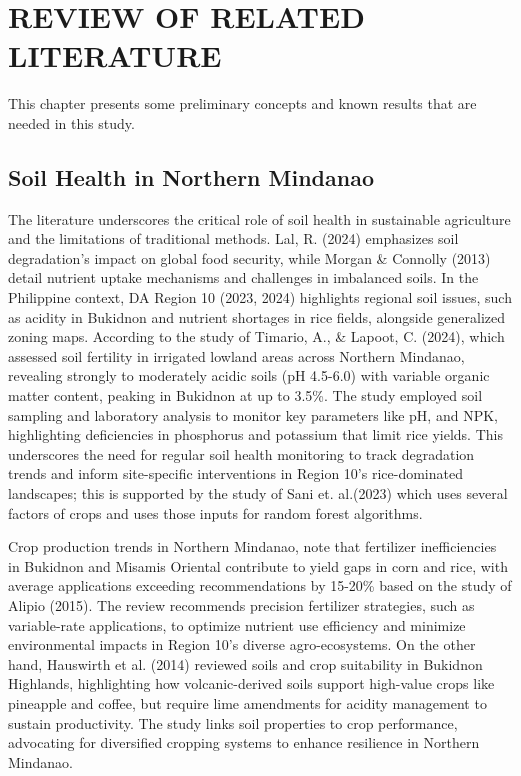 \chapter{REVIEW OF RELATED LITERATURE}
{\baselineskip
This chapter presents some preliminary concepts and known results that are needed in this study.

\section{Soil Health in Northern Mindanao}
The literature underscores the critical role of soil health in sustainable agriculture and the limitations of traditional methods. Lal, R. (2024) emphasizes soil degradation's impact on global food security, while Morgan \& Connolly (2013) detail nutrient uptake mechanisms and challenges in imbalanced soils.  In the Philippine context, DA Region 10 (2023, 2024) highlights regional soil issues, such as acidity in Bukidnon and nutrient shortages in rice fields, alongside generalized zoning maps. According to the study of Timario, A., \& Lapoot, C. (2024), which assessed soil fertility in irrigated lowland areas across Northern Mindanao, revealing strongly to moderately acidic soils (pH 4.5-6.0) with variable organic matter content, peaking in Bukidnon at up to 3.5\%. The study employed soil sampling and laboratory analysis to monitor key parameters like pH, and NPK, highlighting deficiencies in phosphorus and potassium that limit rice yields. This underscores the need for regular soil health monitoring to track degradation trends and inform site-specific interventions in Region 10's rice-dominated landscapes; this is supported by the study of Sani et. al.(2023) which uses several factors of crops and uses those inputs for random forest algorithms.

Crop production trends in Northern Mindanao, note that fertilizer inefficiencies in Bukidnon and Misamis Oriental contribute to yield gaps in corn and rice, with average applications exceeding recommendations by 15-20\% based on the study of Alipio (2015). The review recommends precision fertilizer strategies, such as variable-rate applications, to optimize nutrient use efficiency and minimize environmental impacts in Region 10's diverse agro-ecosystems. On the other hand, Hauswirth et al. (2014) reviewed soils and crop suitability in Bukidnon Highlands, highlighting how volcanic-derived soils support high-value crops like pineapple and coffee, but require lime amendments for acidity management to sustain productivity. The study links soil properties to crop performance, advocating for diversified cropping systems to enhance resilience in Northern Mindanao. 

}
